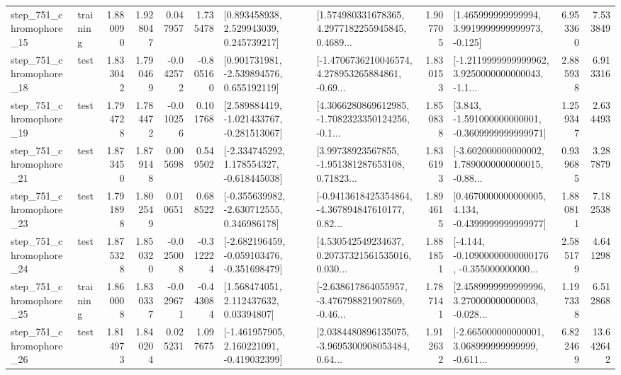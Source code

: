 \begin{tabular}{llrrrrllrlrr}
  step\_751\_chromophore\_15 &  training &      1.880090 &    1.928047 &      0.047957 &  1.735478 &     [0.893458938, 2.529943039, 0.245739217] &  [1.574980331678365, 4.2977182255945845, 0.4689... &       1.907705 &    [1.465999999999994, 3.9919999999999973, -0.125] &            6.953360 &          7.533849 \\
  step\_751\_chromophore\_18 &      test &      1.833042 &    1.790469 &     -0.042572 & -0.805160 &    [0.901731981, -2.539894576, 0.655192119] &  [-1.4706736210046574, 4.278953265884861, -0.69... &       1.830153 &  [-1.2119999999999962, 3.9250000000000043, -1.1... &            2.885938 &          6.913316 \\
  step\_751\_chromophore\_19 &      test &      1.794728 &    1.784472 &     -0.010256 &  0.101768 &   [2.589884419, -1.021433767, -0.281513067] &  [4.3066280869612985, -1.7082323350124256, -0.1... &       1.850838 &   [3.843, -1.591000000000001, -0.3609999999999971] &            1.259347 &          2.634493 \\
  step\_751\_chromophore\_21 &      test &      1.873450 &    1.879148 &      0.005698 &  0.549502 &   [-2.334745292, 1.178554327, -0.618445038] &  [3.99738923567855, -1.951381287653108, 0.71823... &       1.836193 &  [-3.602000000000002, 1.7890000000000015, -0.88... &            0.939685 &          3.287879 \\
  step\_751\_chromophore\_23 &      test &      1.791898 &    1.802549 &      0.010651 &  0.688522 &   [-0.355639982, -2.630712555, 0.346986178] &  [-0.9413618425354864, -4.367894847610177, 0.82... &       1.894615 &   [0.4670000000000005, 4.134, -0.4399999999999977] &            1.880811 &          7.182538 \\
  step\_751\_chromophore\_24 &      test &      1.875328 &    1.850320 &     -0.025008 & -0.312224 &  [-2.682196459, -0.059103476, -0.351698479] &  [4.530542549234637, 0.20737321561535016, 0.030... &       1.881851 &  [-4.144, -0.10900000000000176, -0.355000000000... &            2.585179 &          4.641298 \\
  step\_751\_chromophore\_25 &  training &      1.860008 &    1.830337 &     -0.029671 & -0.443084 &      [1.568474051, 2.112437632, 0.03394807] &  [-2.638617864055957, -3.476798821907869, -0.46... &       1.787141 &  [2.4589999999999996, 3.270000000000003, -0.028... &            1.197338 &          6.512868 \\
  step\_751\_chromophore\_26 &      test &      1.814973 &    1.840204 &      0.025231 &  1.097675 &   [-1.461957905, 2.160221091, -0.419032399] &  [2.0384480896135075, -3.9695300908053484, 0.64... &       1.912632 &  [-2.665000000000001, 3.068999999999999, -0.611... &            6.822469 &         13.642642 \\

\end{tabular}

